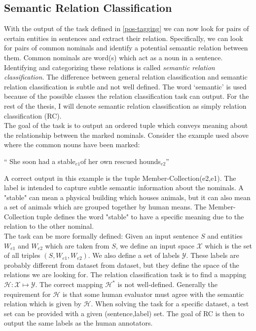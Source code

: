 \subsection{Semantic Relation Classification}
\label{define_rc}
With the output of the task defined in \ref{pos-tagging} we can now look for pairs of certain entities in sentences and extract their relation. Specifically, we can look for pairs of common nominals and identify a potential semantic relation between them. Common nominals are word(s) which act as a noun in a sentence. Identifying and categorizing these relations is called \emph{semantic relation classification}. The difference between general relation classification and semantic relation classification is subtle and not well defined. The word `semantic' is used because of the possible classes the relation classification task can output\cite{semeval2007}\cite{semeval2010}. For the rest of the thesis, I will denote semantic relation classification as simply relation classification (RC). \\
The goal of the task is to output an ordered tuple which conveys meaning about the relationship between the marked nominals.
Consider the example used above where the common nouns have been marked:

\begin{center}
`` She soon had a stable$_{e1}$of her own rescued hounds$_{e2}$''
\end{center}

A correct output in this example is the tuple Member-Collection(e2,e1). The label is intended to capture subtle semantic information about the nominals. A "stable" can mean a physical building which houses animals, but it can also mean a set of animals which are grouped together by human means. The Member-Collection tuple defines the word "stable" to have a specific meaning due to the relation to the other nominal.\\

The task can be more formally defined:
Given an input sentence $S$ and entities $W_{e1}$ and $W_{e2}$ which are taken from $S$, we define an input space $\mathcal{X}$ which is the set of all triples $(S,W_{e1},W_{e2})$. %
We also define a set of labels $\mathcal{Y}$. These labels are probably different from dataset from dataset, but they define the space of the relations we are looking for. The relation classification task is to find a mapping $\mathcal{H} : \mathcal{X} \mapsto \mathcal{Y}$. The correct mapping $\mathcal{H}^*$ is not well-defined. Generally the requirement for $\mathcal{H}$ is that some human evaluator must agree with the semantic relation which is given by $\mathcal{H}$. When solving the task for a specific dataset, a test set can be provided with a given (sentence,label) set. The goal of RC is then to output the same labels as the human annotators.

